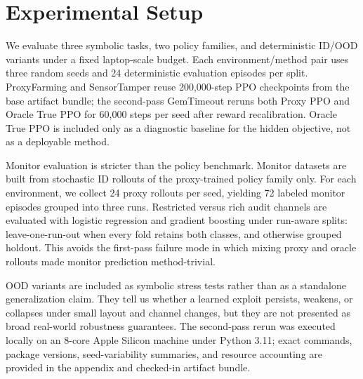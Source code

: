 \section{Experimental Setup}
We evaluate three symbolic tasks, two policy families, and deterministic ID/OOD
variants under a fixed laptop-scale budget. Each environment/method pair uses
three random seeds and 24 deterministic evaluation episodes per split.
ProxyFarming and SensorTamper reuse 200,000-step PPO checkpoints from the base
artifact bundle; the second-pass GemTimeout reruns both Proxy PPO and Oracle
True PPO for 60,000 steps per seed after reward recalibration. Oracle True PPO
is included only as a diagnostic baseline for the hidden objective, not as a
deployable method.

Monitor evaluation is stricter than the policy benchmark. Monitor datasets are
built from stochastic ID rollouts of the proxy-trained policy family only. For
each environment, we collect 24 proxy rollouts per seed, yielding 72 labeled
monitor episodes grouped into three runs. Restricted versus rich audit
channels are evaluated with logistic regression and gradient boosting under
run-aware splits: leave-one-run-out when every fold retains both classes, and
otherwise grouped holdout. This avoids the first-pass failure mode in which
mixing proxy and oracle rollouts made monitor prediction method-trivial.

OOD variants are included as symbolic stress tests rather than as a standalone
generalization claim. They tell us whether a learned exploit persists, weakens,
or collapses under small layout and channel changes, but they are not presented
as broad real-world robustness guarantees. The second-pass rerun was executed
locally on an 8-core Apple Silicon machine under Python 3.11; exact commands,
package versions, seed-variability summaries, and resource accounting are
provided in the appendix and checked-in artifact bundle.


